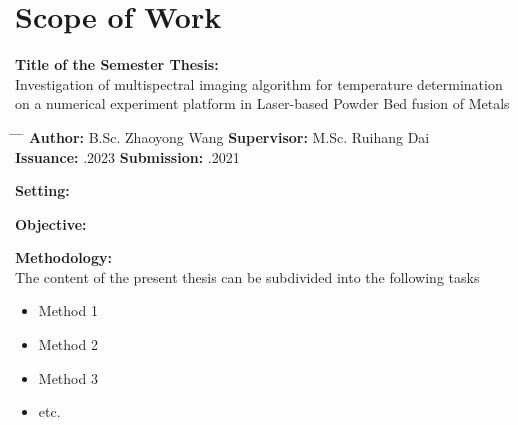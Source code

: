 \chapter*{Scope of Work}


\textbf{Title of the Semester Thesis:}\\
\Large{Investigation of multispectral imaging algorithm for temperature
determination on a numerical experiment platform in Laser-based 
Powder Bed fusion of Metals}\\
\normalsize

\begin{tabbing}
	\hspace{7em} 		\= \hspace{13em}			\= \hspace{7em} 		\= \kill
	\textbf{Author:}  \> B.Sc. Zhaoyong Wang 	\> \textbf{Supervisor:} 	\>  M.Sc. Ruihang Dai \\
	\textbf{Issuance:} 	.2023 	\> \textbf{Submission:} 	.2021
\end{tabbing}

\vspace{5mm}
\textbf{Setting:}\\
\blindtext%

\vspace{5mm}
\textbf{Objective:}\\
\blindtext

\vspace{5mm}
\textbf{Methodology:} \\
The content of the present thesis can be subdivided into the following tasks
\begin{itemize}
	\item Method 1
	\item Method 2
	\item Method 3
	\item etc.
\end{itemize}
\vspace{1.0cm}

